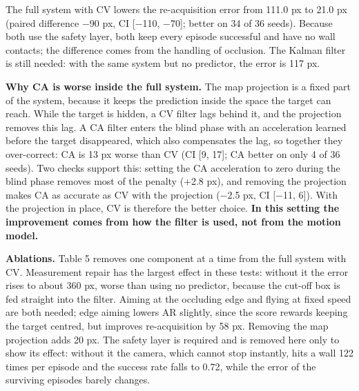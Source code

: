 \documentclass[12pt,a4paper]{article}
\begin{document}
The full system with CV lowers the re-acquisition error from 111.0 px to 21.0 px (paired difference $-$90 px, CI [$-$110, $-$70]; better on 34 of 36 seeds). Because both use the safety layer, both keep every episode successful and have no wall contacts; the difference comes from the handling of occlusion. The Kalman filter is still needed: with the same system but no predictor, the error is 117 px.

\textbf{Why CA is worse inside the full system.} The map projection is a fixed part of the system, because it keeps the prediction inside the space the target can reach. While the target is hidden, a CV filter lags behind it, and the projection removes this lag. A CA filter enters the blind phase with an acceleration learned before the target disappeared, which also compensates the lag, so together they over-correct: CA is 13 px worse than CV (CI [9, 17]; CA better on only 4 of 36 seeds). Two checks support this: setting the CA acceleration to zero during the blind phase removes most of the penalty (+2.8 px), and removing the projection makes CA as accurate as CV with the projection ($-$2.5 px, CI [$-$11, 6]). With the projection in place, CV is therefore the better choice. \textbf{In this setting the improvement comes from how the filter is used, not from the motion model.}

\textbf{Ablations.} Table 5 removes one component at a time from the full system with CV. Measurement repair has the largest effect in these tests: without it the error rises to about 360 px, worse than using no predictor, because the cut-off box is fed straight into the filter. Aiming at the occluding edge and flying at fixed speed are both needed; edge aiming lowers AR slightly, since the score rewards keeping the target centred, but improves re-acquisition by 58 px. Removing the map projection adds 20 px. The safety layer is required and is removed here only to show its effect: without it the camera, which cannot stop instantly, hits a wall 122 times per episode and the success rate falls to 0.72, while the error of the surviving episodes barely changes.
\end{document}
